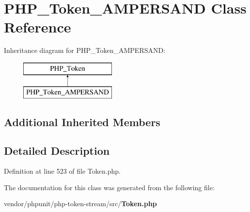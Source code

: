 \section{P\+H\+P\+\_\+\+Token\+\_\+\+A\+M\+P\+E\+R\+S\+A\+N\+D Class Reference}
\label{class_p_h_p___token___a_m_p_e_r_s_a_n_d}
Inheritance diagram for P\+H\+P\+\_\+\+Token\+\_\+\+A\+M\+P\+E\+R\+S\+A\+N\+D\+:\begin{figure}[H]
\begin{center}
\leavevmode
\includegraphics[height=2.000000cm]{class_p_h_p___token___a_m_p_e_r_s_a_n_d}
\end{center}
\end{figure}
\subsection*{Additional Inherited Members}


\subsection{Detailed Description}


Definition at line 523 of file Token.\+php.



The documentation for this class was generated from the following file\+:\begin{DoxyCompactItemize}
\item 
vendor/phpunit/php-\/token-\/stream/src/{\bf Token.\+php}\end{DoxyCompactItemize}
